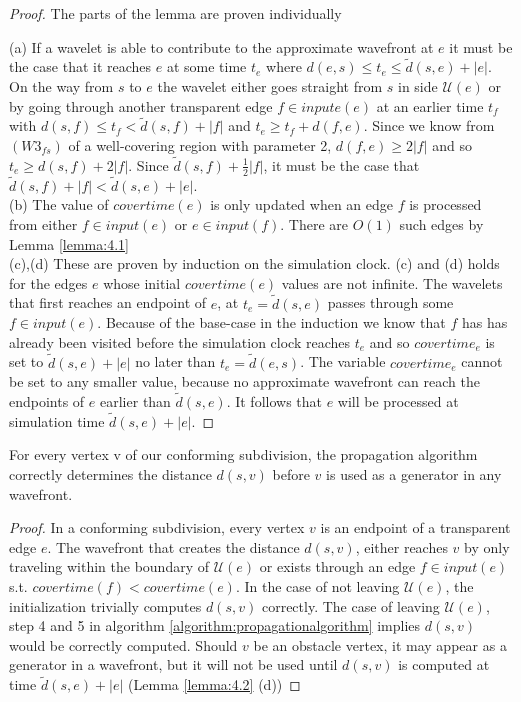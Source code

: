 \begin{proof} 
The parts of the lemma are proven individually

	(a) If a wavelet is able to contribute to the approximate wavefront at $e$
	it must be the case that it reaches $e$ at some time $t_e$ where $d(e,s) \leq
	t_e \leq \tilde{d}(s,e)+|e|$. 
	On the way from $s$ to $e$ the wavelet either goes straight from $s$ in side 
	$\mathcal{U}(e)$ or by going through another transparent edge  $f \in inpute(e)$ at an 
    earlier time $t_f$ 
	with $d(s,f) \leq t_f < \tilde{d}(s,f)+|f|$ and $t_e \geq t_f+d(f,e)$.  
	Since we know from $(W3_{fs})$ of a well-covering region with parameter 2, 	   
    $d(f,e)\geq 2|f|$	
	and so $t_e \geq d(s,f)+2|f|$. Since $\tilde{d}(s,f)+\frac{1}{2}|f|$, it
	must be the case that $\tilde{d}(s,f)+|f|<\tilde{d}(s,e)+|e|$. \\

	(b) The value of $covertime(e)$ is only updated when an edge $f$ is processed
	from either $f \in input(e)$ or $e \in input(f)$. There are $O(1)$ such edges by
	Lemma \ref{lemma:4.1} \\

	(c),(d) These are proven by induction on the simulation clock. (c) and
	(d) holds for the edges $e$ whose initial $covertime(e)$ values are not
	infinite. The wavelets that first reaches an endpoint of $e$, at
	$t_e=\tilde{d}(s,e)$ passes through some $f \in input(e)$. Because of the
	base-case in the induction we know that $f$ has has already been visited before the 
    simulation clock
	reaches $t_e$ and so $covertime_e$ is set to $\tilde{d}(s,e)+|e|$ no later
	than $t_e=\tilde{d}(e,s)$. The variable $covertime_e$ cannot be set to any
	smaller value, because no approximate wavefront can reach the endpoints of
	$e$ earlier than $\tilde{d}(s,e)$. It follows that $e$ will be processed at
	simulation time $\tilde{d}(s,e)+|e|$.
\end{proof}

\begin{Lemma} \label{lemma:4.3}
	For every vertex v of our conforming subdivision, the propagation algorithm
	correctly determines the distance $d(s,v)$ before $v$ is used as a generator in
	any wavefront.	
\end{Lemma}

\begin{proof}
	In a conforming subdivision, every vertex $v$ is an endpoint of a transparent edge 
    $e$. The wavefront that creates the distance $d(s,v)$, either reaches $v$ by only 
    traveling within the boundary of $\mathcal{U}(e)$ or exists through an edge $f \in 
    input(e)$ s.t. $covertime(f) < covertime(e)$. In the case of not leaving $\mathcal{U}(e)$, 
    the initialization trivially computes $d(s,v)$ correctly. The case of leaving 
    $\mathcal{U}(e)$, step 4 and 5 in algorithm \ref{algorithm:propagationalgorithm} 
    implies $d(s,v)$ would be correctly computed. Should $v$ be an obstacle vertex, it may 
    appear as a generator in a wavefront, but it will not be used until $d(s,v)$ is 
    computed at time $\tilde{d}(s,e)+|e|$ (Lemma \ref{lemma:4.2} (d))
\end{proof}


